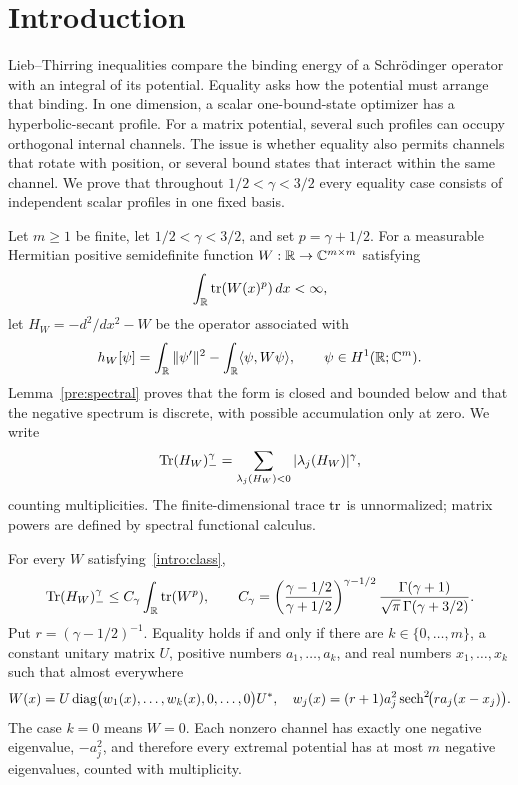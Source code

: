 \section{Introduction}\label{intro:section}

Lieb--Thirring inequalities compare the binding energy of a Schr\"odinger
operator with an integral of its potential. Equality asks how the potential
must arrange that binding. In one dimension, a scalar one-bound-state
optimizer has a hyperbolic-secant profile. For a matrix potential, several
such profiles can occupy orthogonal internal channels. The issue is whether
equality also permits channels that rotate with position, or several bound
states that interact within the same channel. We prove that throughout
$1/2<\gamma<3/2$ every equality case consists of independent scalar profiles
in one fixed basis.

Let $m\ge1$ be finite, let $1/2<\gamma<3/2$, and set
$p=\gamma+1/2$. For a measurable Hermitian positive semidefinite function
$W:\mathbb R\to\mathbb C^{m\times m}$ satisfying
\begin{equation}\label{intro:class}
 \int_\mathbb R\operatorname{tr}(W(x)^p)\,dx<\infty,
\end{equation}
let $H_W=-d^2/dx^2-W$ be the operator associated with
\begin{equation}\label{intro:form}
 h_W[\psi]=\int_\mathbb R\|\psi'\|^2
       -\int_\mathbb R\langle\psi,W\psi\rangle,
 \qquad \psi\in H^1(\mathbb R;\mathbb C^m).
\end{equation}
Lemma~\ref{pre:spectral} proves that the form is closed and bounded below
and that the negative spectrum is discrete, with possible accumulation
only at zero. We write
\[
 \operatorname{Tr}(H_W)_-^\gamma=\sum_{\lambda_j(H_W)<0}|\lambda_j(H_W)|^\gamma,
\]
counting multiplicities. The finite-dimensional trace $\operatorname{tr}$ is unnormalized;
matrix powers are defined by spectral functional calculus.

\begin{theorem}\label{thm:main}
For every $W$ satisfying~\eqref{intro:class},
\begin{equation}\label{intro:sharp}
 \operatorname{Tr}(H_W)_-^\gamma\le C_\gamma\int_\mathbb R\operatorname{tr}(W^p),
 \qquad
 C_\gamma=\left(\frac{\gamma-1/2}{\gamma+1/2}\right)^{\gamma-1/2}
       \frac{\Gamma(\gamma+1)}{\sqrt\pi\,\Gamma(\gamma+3/2)}.
\end{equation}
Put $r=(\gamma-1/2)^{-1}$. Equality holds if and only if there are
$k\in\{0,\ldots,m\}$, a constant unitary matrix $U$, positive numbers
$a_1,\ldots,a_k$, and real numbers $x_1,\ldots,x_k$ such that almost
everywhere
\begin{equation}\label{intro:classification}
 W(x)=U\operatorname{diag}\bigl(w_1(x),\ldots,w_k(x),0,\ldots,0\bigr)U^*,
 \quad
 w_j(x)=(r+1)a_j^2\operatorname{sech}^2\!\bigl(ra_j(x-x_j)\bigr).
\end{equation}
The case $k=0$ means $W=0$. Each nonzero channel has exactly one negative
eigenvalue, $-a_j^2$, and therefore every extremal potential has at most
$m$ negative eigenvalues, counted with multiplicity.
\end{theorem}

